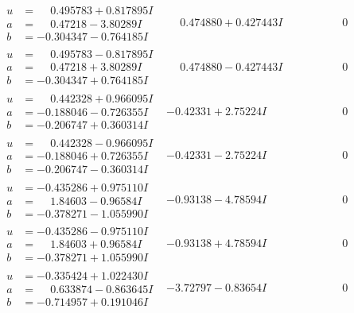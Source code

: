 \documentclass[1p]{elsarticle_modified}
\theoremstyle{definition}
\begin{document}
$$\begin{array}{c|c|c}
\begin{aligned}
u &= \phantom{-}0.495783 + 0.817895 I \\
a &= \phantom{-}0.47218 - 3.80289 I \\
b &= -0.304347 - 0.764185 I\end{aligned}
 & \phantom{-}0.474880 + 0.427443 I & \phantom{-0.000000 } 0 \\ \hline\begin{aligned}
u &= \phantom{-}0.495783 - 0.817895 I \\
a &= \phantom{-}0.47218 + 3.80289 I \\
b &= -0.304347 + 0.764185 I\end{aligned}
 & \phantom{-}0.474880 - 0.427443 I & \phantom{-0.000000 } 0 \\ \hline\begin{aligned}
u &= \phantom{-}0.442328 + 0.966095 I \\
a &= -0.188046 - 0.726355 I \\
b &= -0.206747 + 0.360314 I\end{aligned}
 & -0.42331 + 2.75224 I & \phantom{-0.000000 } 0 \\ \hline\begin{aligned}
u &= \phantom{-}0.442328 - 0.966095 I \\
a &= -0.188046 + 0.726355 I \\
b &= -0.206747 - 0.360314 I\end{aligned}
 & -0.42331 - 2.75224 I & \phantom{-0.000000 } 0 \\ \hline\begin{aligned}
u &= -0.435286 + 0.975110 I \\
a &= \phantom{-}1.84603 - 0.96584 I \\
b &= -0.378271 - 1.055990 I\end{aligned}
 & -0.93138 - 4.78594 I & \phantom{-0.000000 } 0 \\ \hline\begin{aligned}
u &= -0.435286 - 0.975110 I \\
a &= \phantom{-}1.84603 + 0.96584 I \\
b &= -0.378271 + 1.055990 I\end{aligned}
 & -0.93138 + 4.78594 I & \phantom{-0.000000 } 0 \\ \hline\begin{aligned}
u &= -0.335424 + 1.022430 I \\
a &= \phantom{-}0.633874 - 0.863645 I \\
b &= -0.714957 + 0.191046 I\end{aligned}
 & -3.72797 - 0.83654 I & \phantom{-0.000000 } 0 \\ \hline\begin{aligned}

\end{aligned}
\end{array}$$
\end{document}
